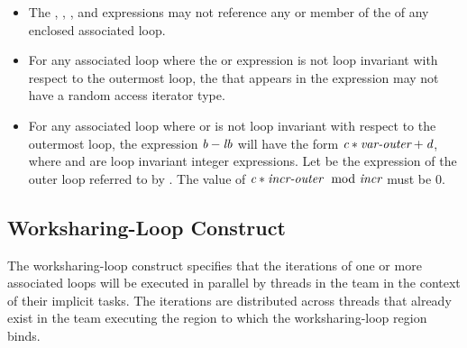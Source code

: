 \begin{itemize}
    \item The , , , and  expressions
      may not reference any  or member of the  of any
      enclosed associated loop.

    \item For any associated loop where the  or  expression is not loop
        invariant with respect to the outermost loop, the  that
        appears in the expression may not have a random access iterator type.

    \item For any associated loop where  or  is not loop invariant with
        respect to the outermost loop, the expression $\plc{b}-\plc{lb}$ will
        have the form $\plc{c}*\plc{var-outer}+\plc{d}$, where  and 
        are loop invariant integer expressions. Let  be the
         expression of the outer loop referred to by
        .  The value of $\plc{c}*\plc{incr-outer} \mod \plc{incr}$ must be 0.

\end{itemize}



\subsection{Worksharing-Loop Construct}
\label{subsec:Worksharing-Loop Construct}
\summary
The worksharing-loop construct specifies that the iterations of one or more associated loops will be
executed in parallel by threads in the team in the context of their implicit tasks. The
iterations are distributed across threads that already exist in the team executing the
 region to which the worksharing-loop region binds.

